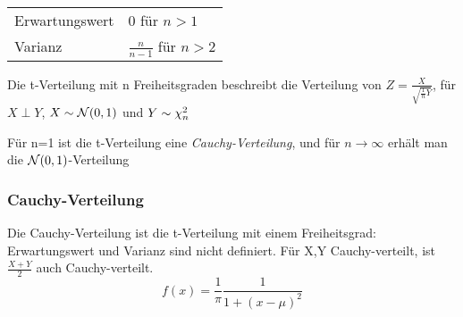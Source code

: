 \begin{highlight}
	\begin{tabular}{l@{ : }l}
		Erwartungswert & \(0\)  				\qquad für \(n>1\)            \\
		Varianz        & \(\frac{n}{n-1}\) 	\qquad für \(n>2\)
	\end{tabular}
\end{highlight}

Die t-Verteilung mit n Freiheitsgraden beschreibt die Verteilung von
\(Z = \frac{ X }{ \sqrt{ \frac{1}{n} Y } } \), für \(X \perp Y\), \(X \sim \mathcal{N}(0,1)\) und \(Y \sim \chi_n^2\)

\begin{note}
	Für n=1 ist die t-Verteilung eine \emph{Cauchy-Verteilung},
	und für \(n \rightarrow \infty\) erhält man die \(\mathcal{N}(0,1)\)-Verteilung
\end{note}


\subsubsection{Cauchy-Verteilung}
Die Cauchy-Verteilung ist die t-Verteilung mit einem Freiheitsgrad:
Erwartungswert und Varianz sind nicht definiert.
Für X,Y Cauchy-verteilt, ist \(\frac{X+Y}{2}\) auch Cauchy-verteilt.
\[ f(x) = \frac{1}{\pi}\frac{1}{1+(x-\mu)^2} \]


